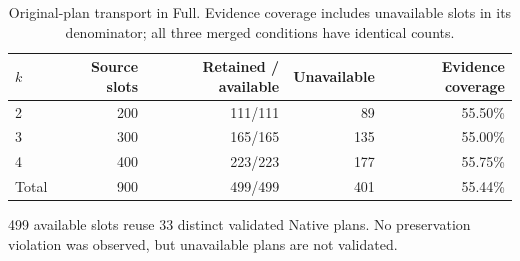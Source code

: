 \begin{table}[htbp]
\centering\small
\caption{Original-plan transport in Full. Evidence coverage includes unavailable slots in its denominator; all three merged conditions have identical counts.}
\label{tab:preservation}
\begin{tabular}{lrrrr}
\toprule
$k$ & Source slots & Retained / available & Unavailable & Evidence coverage \\
\midrule
2 & 200 & 111/111 & 89 & 55.50\% \\
3 & 300 & 165/165 & 135 & 55.00\% \\
4 & 400 & 223/223 & 177 & 55.75\% \\
Total & 900 & 499/499 & 401 & 55.44\% \\
\bottomrule
\end{tabular}
\par\smallskip\begin{minipage}{0.97\linewidth}\small 499 available slots reuse 33 distinct validated Native plans. No preservation violation was observed, but unavailable plans are not validated.\end{minipage}
\end{table}
